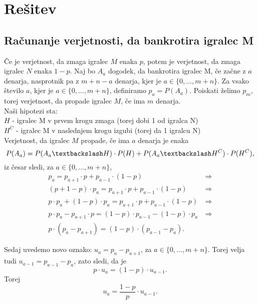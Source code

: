 \documentclass[12pt, a4paper]{article}
\begin{document}
\newpage

\section[Rešitev]{Rešitev}
\subsection{Računanje verjetnosti, da bankrotira igralec M}

Če je verjetnost, da zmaga igralec $M$ enaka $p$, potem je verjetnost, da zmaga igralec $N$ enaka $1-p$. Naj bo $A_a$ dogodek, da bankrotira igralec M, če začne z $a$ denarja, nasprotnik pa z $m + n - a$ denarja, kjer je $ a \in \{ 0, \dotso , m + n\}$. Za vsako število $a$, kjer je $ a \in \{ 0, \dotso , m + n\}$,  definiramo $p_a = P(A_a)$.
Poiskati želimo $p_m$, torej verjetnost, da propade igralec $M$, če ima $m$ denarja. 
\\

Naši hipotezi sta:
\\
$H$ - igralec M v prvem krogu zmaga (torej dobi 1 od igralca N)
\\
$H^C$ - igralec M v naslednjem krogu izgubi (torej da 1 igralcu N)
\\

Verjetnost, da igralec $M$ propade, če ima $a$ denarja je enaka
\\
$$P(A_a) = P(A_a \textbackslash  H) \cdot P(H) + P(A_a \textbackslash  H^C) \cdot P(H^C),$$
 iz česar sledi, za $ a \in \{ 0, \dotso , m + n\}$,
\begin{equation*}
\begin{split}
p_a = p_{a+1} \cdot p + p_{a-1} \cdot (1 - p) &~ \Rightarrow \\
(p + 1 -p) \cdot p_a = p_{a+1} \cdot p + p_{a-1} \cdot (1 - p) &~ \Rightarrow \\
 p \cdot p_a + (1 - p) \cdot p_a = p_{a+1} \cdot p + p_{a-1} \cdot (1 - p) &~ \Rightarrow \\
p \cdot p_a - p_{a+1} \cdot p = (1 - p) \cdot  p_{a-1} - (1-p) \cdot p_a &~ \Rightarrow \\
p \cdot (p_a - p_{a+1}) = (1-p) \cdot (p_{a-1} - p_a). &~
\end{split}
\end{equation*}


Sedaj uvedemo novo oznako: $u_a = p_a - p_{a+1}$, za  $ a \in \{ 0, \dotso , m + n\}$. Torej velja tudi $u_{a-1} = p_{a-1} - p_a$, zato sledi, da je
$$p \cdot u_a = (1 - p) \cdot u_{a-1}.$$
Torej $$u_a = \frac{1-p}{p} \cdot u_{a-1}.$$
\end{document}
